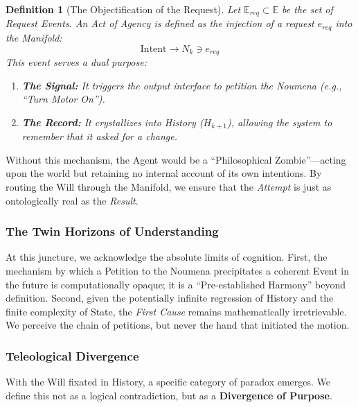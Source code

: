 \documentclass[11pt, a4paper]{article}
\theoremstyle{formalism}
\newtheorem{formalism}{Definition}
\begin{document}
{\begin{formalism}[The Objectification of the Request]
Let $\mathbb{E}_{req} \subset \mathbb{E}$ be the set of Request Events.
An Act of Agency is defined as the injection of a request $e_{req}$ into the Manifold:
\begin{equation}
\text{Intent} \to N_k \ni e_{req}
\end{equation}
This event serves a dual purpose:
\begin{enumerate}

    \item \textbf{The Signal:} It triggers the output interface to petition the
        Noumena (e.g., ``Turn Motor On'').

    \item \textbf{The Record:} It crystallizes into History ($H_{k+1}$),
        allowing the system to remember that it \textit{asked} for a change.

\end{enumerate}
\end{formalism}

Without this mechanism, the Agent would be a ``Philosophical Zombie''---acting
upon the world but retaining no internal account of its own intentions. By
routing the Will through the Manifold, we ensure that the \textit{Attempt} is
just as ontologically real as the \textit{Result}.

\subsubsection{The Twin Horizons of Understanding}

At this juncture, we acknowledge the absolute limits of cognition. First, the mechanism by which a Petition to the Noumena precipitates
a coherent Event in the future is computationally opaque; it is a
``Pre-established Harmony'' beyond definition. Second, given the potentially
infinite regression of History and the finite complexity of State, the
\textit{First Cause} remains mathematically irretrievable. We perceive the
chain of petitions, but never the hand that initiated the motion.

\subsubsection{Teleological Divergence}

With the Will fixated in History, a specific category of paradox emerges. We
define this not as a logical contradiction, but as a \textbf{Divergence of
Purpose}.

}
\end{document}
